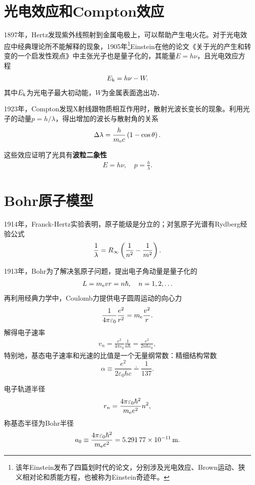 \section{光电效应和Compton效应}
1897年，Hertz发现紫外线照射到金属电极上，可以帮助产生电火花。对于光电效应中经典理论所不能解释的现象，1905年\footnote{该年Einstein发布了四篇划时代的论文，分别涉及光电效应、Brown运动、狭义相对论和质能方程，也被称为Einstein奇迹年。}Einstein在他的论文《关于光的产生和转变的一个启发性观点》中主张光子也是量子化的，其能量$E=h\nu$，且光电效应方程
\begin{align}
	E_{\mathrm k}=h\nu-W.
\end{align}
其中$E_{\mathrm k}$为光电子最大初动能，$W$为金属表面逸出功．

1923年，Compton发现X射线跟物质相互作用时，散射光波长变长的现象。利用光子的动量$p=h/\lambda$，得出增加的波长与散射角的关系
\begin{align}
	\Delta\lambda=\frac h{m_\mathrm e c}\left(1-\cos\theta\right).
\end{align}

这些效应证明了光具有\textbf{波粒二象性}
\begin{align}
	E=h\nu,\quad p=\frac h\lambda.
\end{align}
\section{Bohr原子模型}
1914年，Franck-Hertz实验表明，原子能级是分立的；对氢原子光谱有Rydberg经验公式
\begin{align}
	\frac1\lambda=R_\infty\left(\frac1{n^2}-\frac1{m^2}\right).
\end{align}

1913年，Bohr为了解决氢原子问题，提出电子角动量是量子化的
\begin{align}
	L=m_\mathrm e vr=n\hbar,\quad n=1,2,\ldots
\end{align}
再利用经典力学中，Coulomb力提供电子圆周运动的向心力
\[
	\frac1{4\pi\varepsilon_0}\frac{e^2}{r^2}=m_\mathrm e\frac{v^2}r.
\]
解得电子速率
\begin{align}
	v_n=\frac{e^2}{4\pi\varepsilon_0}\frac{1}{n\hbar}=\frac{e^2}{2nh\varepsilon_0},
\end{align}
特别地，基态电子速率和光速的比值是一个无量纲常数：精细结构常数
\[
	\alpha\equiv\frac{e^2}{2\varepsilon_0 hc}\doteq\frac1{137}.
\]

电子轨道半径
\begin{align}
	r_n=\frac{4\pi\varepsilon_0\hbar^2}{m_\mathrm e e^2}n^2,
\end{align}
称基态半径为Bohr半径
\[
a_0\equiv\frac{4\pi\varepsilon_0\hbar^2}{m_\mathrm e e^2}=\SI{5.29177e-11}{m}.
\]


